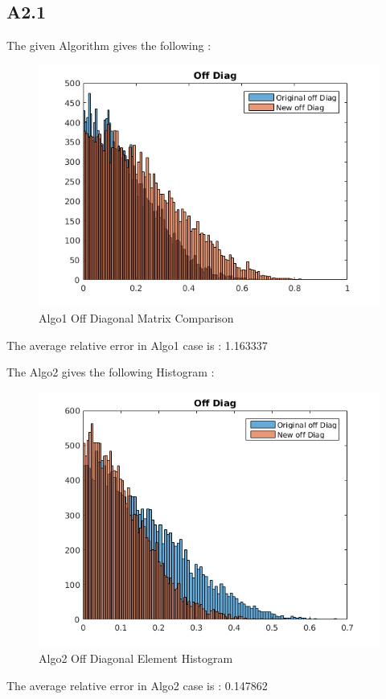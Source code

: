 \documentclass{article}
\begin{document}
\subsection*{A2.1}
The given Algorithm gives the following :
\begin{figure}[H]
  \centering
  \includegraphics[scale=0.5]{images/Histogram_actual_algo_off_diag}
  \caption{Algo1 Off Diagonal Matrix Comparison}
  \label{fig:1}
\end{figure}

The average relative error in Algo1 case is : 1.163337

The Algo2 gives the following Histogram :
\begin{figure}[H]
  \centering
  \includegraphics[scale=0.5]{images/Histogram_our_algo_off_diag}
  \caption{Algo2 Off Diagonal Element Histogram}
  \label{fig:2}
\end{figure}
The average relative error in Algo2 case is : 0.147862
\end{document}
